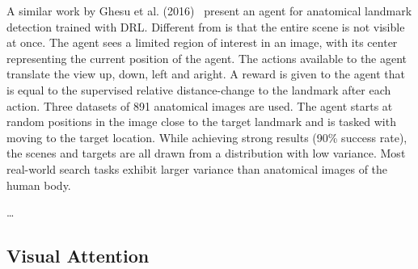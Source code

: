 A similar work by Ghesu et al. (2016)~\cite{ghesu_artificial_2016} present an agent for anatomical landmark detection trained with DRL.
Different from \cite{caicedo_active_2015} is that the entire scene is not visible at once.
The agent sees a limited region of interest in an image, with its center representing the current position of the agent.
The actions available to the agent translate the view up, down, left and aright.
A reward is given to the agent that is equal to the supervised relative distance-change to the landmark after each action.
Three datasets of 891 anatomical images are used.
The agent starts at random positions in the image close to the target landmark and is tasked with moving to the target location.
While achieving strong results (90\% success rate), the scenes and targets are all drawn from a distribution with low variance.
Most real-world search tasks exhibit larger variance than anatomical images of the human body.

\cite{uzkent_detection_2020}\dots



\subsection{Visual Attention}



